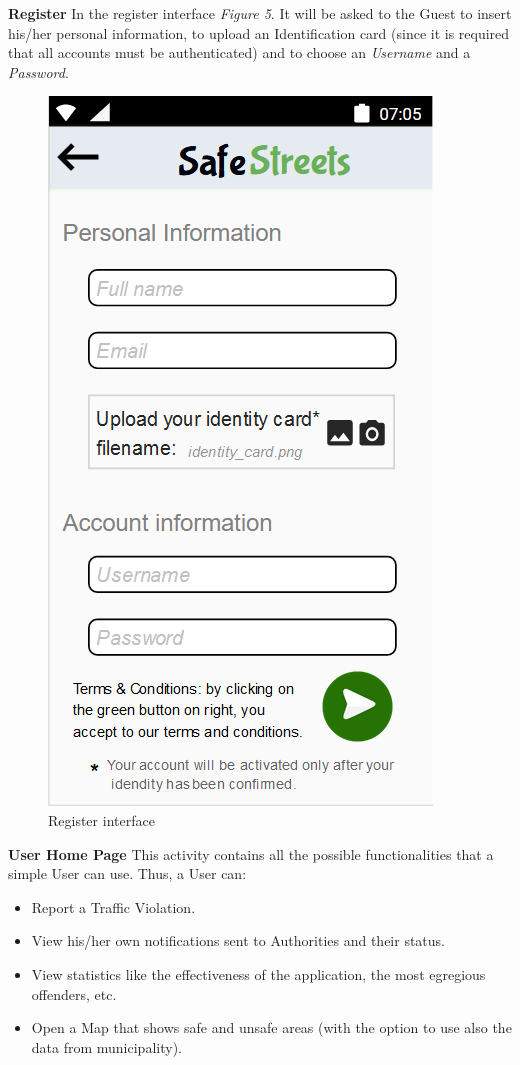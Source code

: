     \noindent\textbf{Register}\newline
    In the register interface \textit{Figure 5}. It will be asked to the Guest to insert his/her personal information, to upload an Identification card (since it is required that all accounts must be authenticated) and to choose an \textit{Username} and a \textit{Password}.
        \begin{figure}[h]
        \centering
        \includegraphics[scale=0.89]{Images/register.png}
        \caption{Register interface}
    \end{figure}
    \newline\textbf{User Home Page}\newline
    This activity contains all the possible functionalities that a simple User can use. Thus, a User can:
    \begin{itemize}
        \item Report a Traffic Violation.
        \item View his/her own notifications sent to Authorities and their status.
        \item View statistics like the effectiveness of the application, the most egregious offenders, etc.
        \item Open a Map that shows safe and unsafe areas (with the option to use also the data from municipality).
    \end{itemize}
